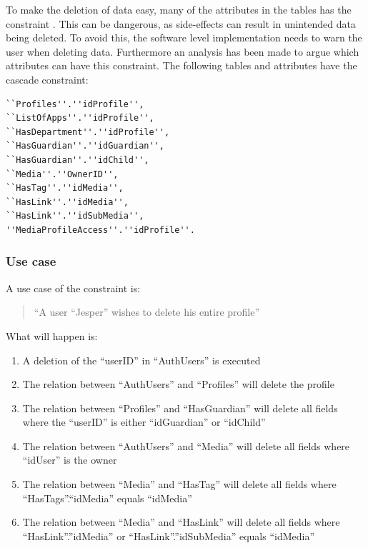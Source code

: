 To make the deletion of data easy, many of the attributes in the tables has the constraint . This can be dangerous, as side-effects can result in unintended data being deleted. To avoid this, the software level implementation needs to warn the user when deleting data. Furthermore an analysis has been made to argue which attributes can have this constraint. The following tables and attributes have the cascade constraint: 
\begin{verbatim}
``Profiles''.''idProfile'', 
``ListOfApps''.''idProfile'', 
``HasDepartment''.''idProfile'', 
``HasGuardian''.''idGuardian'', 
``HasGuardian''.''idChild'', 
``Media''.''OwnerID'', 
``HasTag''.''idMedia'', 
``HasLink''.''idMedia'', 
``HasLink''.''idSubMedia'',
''MediaProfileAccess''.''idProfile''.
\end{verbatim}

\subsubsection*{Use case}
 A use case of the constraint is:
\begin{quotation}
``A user ``Jesper'' wishes to delete his entire profile''
\end{quotation}
What will happen is:
\begin{enumerate}
	\item A deletion of the ``userID'' in ``AuthUsers'' is executed
	\item The relation between ``AuthUsers'' and ``Profiles'' will delete the profile
	\item The relation between ``Profiles'' and ``HasGuardian'' will delete all fields where the ``userID'' is either ``idGuardian'' or ``idChild''
	\item The relation between ``AuthUsers'' and ``Media'' will delete all fields where ``idUser'' is the owner
	\item The relation between ``Media'' and ``HasTag'' will delete all fields where ``HasTags''.``idMedia'' equals ``idMedia''
	\item The relation between ``Media'' and ``HasLink'' will delete all fields where ``HasLink''.''idMedia'' or ``HasLink''.''idSubMedia'' equals ``idMedia''
\end{enumerate}

